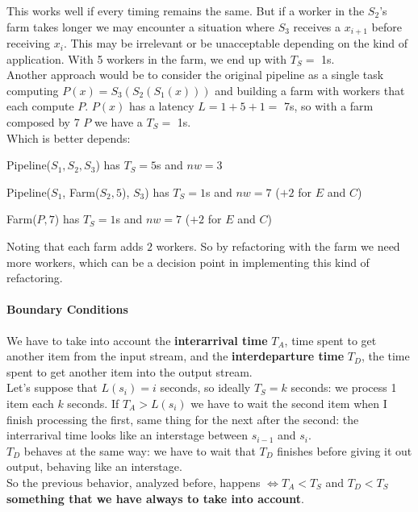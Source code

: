 \documentclass[10pt]{report}
\begin{document}
This works well if every timing remains the same. But if a worker in the $S_2$'s farm takes longer we may encounter a situation where $S_3$ receives a $x_{i+1}$ before receiving $x_i$. This may be irrelevant or be unacceptable depending on the kind of application. With 5 workers in the farm, we end up with $T_S=$ 1s.\\
Another approach would be to consider the original pipeline as a single task computing $P(x) = S_3(S_2(S_1(x)))$ and building a farm with workers that each compute $P$. $P(x)$ has a latency $L = 1+5+1 =$ 7s, so with a farm composed by 7 $P$ we have a $T_S =$ 1s.\\
Which is better depends:
\begin{list}{}{}
	\item Pipeline($S_1, S_2, S_3$) has $T_S=5$s and $nw=3$
	\item Pipeline($S_1$, Farm($S_2,5$), $S_3$) has $T_S=1$s and $nw=7$ ($+2$ for $E$ and $C$)
	\item Farm($P, 7$) has $T_S=1$s and $nw=7$ ($+2$ for $E$ and $C$)
\end{list}
Noting that each farm adds $2$ workers. So by refactoring with the farm we need more workers, which can be a decision point in implementing this kind of refactoring.
\paragraph{Boundary Conditions} We have to take into account the \textbf{interarrival time} $T_A$, time spent to get another item from the input stream, and the \textbf{interdeparture time} $T_D$, the time spent to get another item into the output stream.\\
Let's suppose that $L(s_i) = i$ seconds, so ideally $T_S = k$ seconds: we process 1 item each $k$ seconds. If $T_A > L(s_i)$ we have to wait the second item when I finish processing the first, same thing for the next after the second: the interrarival time looks like an interstage between $s_{i-1}$ and $s_i$.\\
$T_D$ behaves at the same way: we have to wait that $T_D$ finishes before giving it out output, behaving like an interstage.\\
So the previous behavior, analyzed before, happens $\Leftrightarrow T_A<T_S$ and $T_D<T_S$ \textbf{something that we have always to take into account}.
\end{document}
